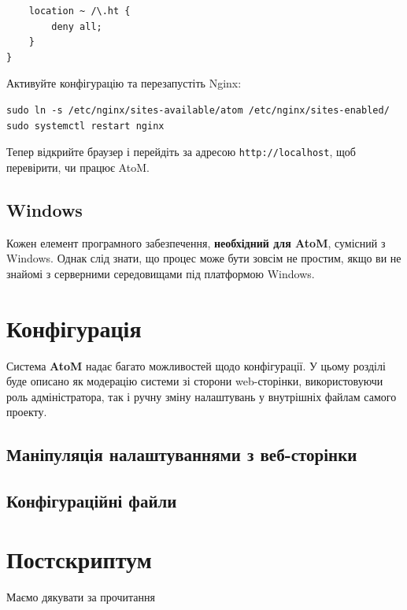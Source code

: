 \documentclass[14pt,a4paper]{article}
\begin{document}
\begin{large}
\begin{lstlisting}
    location ~ /\.ht {
        deny all;
    }
}
\end{lstlisting}

Активуйте конфігурацію та перезапустіть Nginx:

\begin{lstlisting}
sudo ln -s /etc/nginx/sites-available/atom /etc/nginx/sites-enabled/
sudo systemctl restart nginx
\end{lstlisting}


Тепер відкрийте браузер і перейдіть за адресою \texttt{http://localhost}, щоб перевірити, чи працює AtoM.

\subsection{Windows}
Кожен елемент програмного забезпечення, \textbf{необхідний для AtoM}, сумісний з Windows. Однак слід знати, що процес може бути зовсім не простим, якщо ви не знайомі з серверними середовищами під платформою Windows.
\end{large}


\section{Конфігурація}
\begin{large}
Система \textbf{AtoM} надає багато можливостей щодо конфігурації. У цьому розділі буде описано як модерацію системи зі сторони web-сторінки, використовуючи роль адміністратора, так і ручну зміну налаштувань у внутрішніх файлам самого проекту.

\subsection{Маніпуляція налаштуваннями з веб-сторінки}

\subsection{Конфігураційні файли}

\end{large}

\section{Постскриптум}
Маємо дякувати за прочитання
\end{document}
